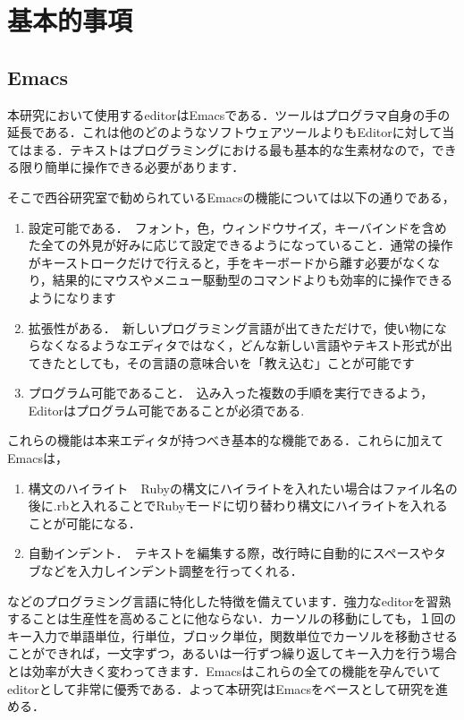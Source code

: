 \documentclass[11pt,dvipdfmx]{jsarticle}
\providecommand{\tightlist}{%
      \setlength{\itemsep}{0pt}\setlength{\parskip}{0pt}}
\begin{document}
    \section{基本的事項}\label{ux57faux672cux7684ux4e8bux9805}

    \subsection{Emacs}\label{emacs}

    本研究において使用するeditorはEmacsである．ツールはプログラマ自身の手の延長である．これは他のどのようなソフトウェアツールよりもEditorに対して当てはまる．テキストはプログラミングにおける最も基本的な生素材なので，できる限り簡単に操作できる必要があります．

そこで西谷研究室で勧められているEmacsの機能については以下の通りである，

\begin{enumerate}
\def\labelenumi{\arabic{enumi}.}
\tightlist
\item
  設定可能である．　フォント，色，ウィンドウサイズ，キーバインドを含めた全ての外見が好みに応じて設定できるようになっていること．通常の操作がキーストロークだけで行えると，手をキーボードから離す必要がなくなり，結果的にマウスやメニュー駆動型のコマンドよりも効率的に操作できるようになります
\item
  拡張性がある．　新しいプログラミング言語が出てきただけで，使い物にならなくなるようなエディタではなく，どんな新しい言語やテキスト形式が出てきたとしても，その言語の意味合いを「教え込む」ことが可能です
\item
  プログラム可能であること．　込み入った複数の手順を実行できるよう，Editorはプログラム可能であることが必須である.
\end{enumerate}

これらの機能は本来エディタが持つべき基本的な機能である．これらに加えてEmacsは，

\begin{enumerate}
\def\labelenumi{\arabic{enumi}.}
\tightlist
\item
  構文のハイライト　Rubyの構文にハイライトを入れたい場合はファイル名の後に.rbと入れることでRubyモードに切り替わり構文にハイライトを入れることが可能になる．
\item
  自動インデント．　テキストを編集する際，改行時に自動的にスペースやタブなどを入力しインデント調整を行ってくれる．
\end{enumerate}

などのプログラミング言語に特化した特徴を備えています．強力なeditorを習熟することは生産性を高めることに他ならない．カーソルの移動にしても，１回のキー入力で単語単位，行単位，ブロック単位，関数単位でカーソルを移動させることができれば，一文字ずつ，あるいは一行ずつ繰り返してキー入力を行う場合とは効率が大きく変わってきます．Emacsはこれらの全ての機能を孕んでいてeditorとして非常に優秀である．よって本研究はEmacsをベースとして研究を進める．
\end{document}
